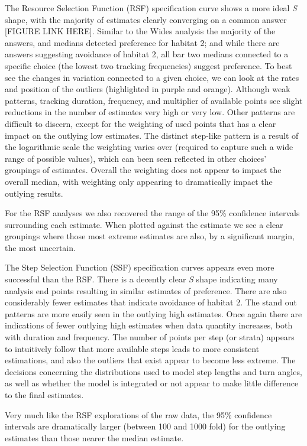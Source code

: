 \documentclass[10pt,a4paper]{article}
\begin{document}
The Resource Selection Function (RSF) specification curve shows a more ideal \emph{S} shape, with the majority of estimates clearly converging on a common answer {[}FIGURE LINK HERE{]}.
Similar to the Wides analysis the majority of the answers, and medians detected preference for habitat 2; and while there are answers suggesting avoidance of habitat 2, all bar two medians connected to a specific choice (the lowest two tracking frequencies) suggest preference.
To best see the changes in variation connected to a given choice, we can look at the rates and position of the outliers (highlighted in purple and orange).
Although weak patterns, tracking duration, frequency, and multiplier of available points see slight reductions in the number of estimates very high or very low.
Other patterns are difficult to discern, except for the weighting of used points that has a clear impact on the outlying low estimates.
The distinct step-like pattern is a result of the logarithmic scale the weighting varies over (required to capture such a wide range of possible values), which can been seen reflected in other choices' groupings of estimates.
Overall the weighting does not appear to impact the overall median, with weighting only appearing to dramatically impact the outlying results.

For the RSF analyses we also recovered the range of the 95\% confidence intervals surrounding each estimate.
When plotted against the estimate we see a clear groupings where those most extreme estimates are also, by a significant margin, the most uncertain.

The Step Selection Function (SSF) specification curves appears even more successful than the RSF.
There is a decently clear \emph{S} shape indicating many analysis end points resulting in similar estimates of preference.
There are also considerably fewer estimates that indicate avoidance of habitat 2.
The stand out patterns are more easily seen in the outlying high estimates.
Once again there are indications of fewer outlying high estimates when data quantity increases, both with duration and frequency.
The number of points per step (or strata) appears to intuitively follow that more available steps leads to more consistent estimations, and also the outliers that exist appear to become less extreme.
The decisions concerning the distributions used to model step lengths and turn angles, as well as whether the model is integrated or not appear to make little difference to the final estimates.

Very much like the RSF explorations of the raw data, the 95\% confidence intervals are dramatically larger (between 100 and 1000 fold) for the outlying estimates than those nearer the median estimate.
\end{document}
